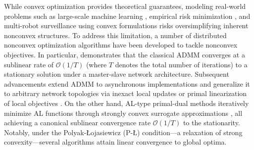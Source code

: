 \documentclass[12pt,draftcls,onecolumn]{IEEEtran}
\begin{document}
While convex optimization provides theoretical guarantees, modeling real-world problems such as large-scale machine learning \cite{NIPS2015_452bf208}, empirical risk minimization \cite{doi:10.1137/16M1080173}, and multi-robot surveillance \cite{CARNEVALE2024111767} using convex formulations risks oversimplifying inherent nonconvex structures. To address this limitation, a number of distributed nonconvex optimization algorithms \cite{hong2016convergence,hong_distributed_2018,mancino2023decentralized,yi2022sublinear,yi2021linear,alghunaim_unified_2022,hong_prox-pda_2017,sun2018distributed,sun_distributed_2019} have been developed to tackle nonconvex objectives. In particular, \cite{hong2016convergence} demonstrates that the classical ADMM converges at a sublinear rate of $\mathcal{O}(1/T)$ (where $T$ denotes the total number of iterations) to a stationary solution under a master-slave network architecture. Subsequent advancements extend ADMM to asynchronous implementations \cite{hong_distributed_2018} and generalize it to arbitrary network topologies via inexact local updates \cite{mancino2023decentralized} or primal linearization of local objectives \cite{yi2022sublinear}. On the other hand, AL-type primal-dual methods iteratively minimize AL functions through strongly convex surrogate approximations \cite{alghunaim_unified_2022,hong_prox-pda_2017,sun2018distributed,sun_distributed_2019}, all achieving a canonical sublinear convergence rate $\mathcal{O}(1/T)$ to the stationarity. Notably, under the Polyak-{\L}ojasiewicz (P-{\L}) condition—a relaxation of strong convexity—several algorithms \cite{yi2022sublinear,yi2021linear,alghunaim_unified_2022} attain linear convergence to global optima.
\end{document}
